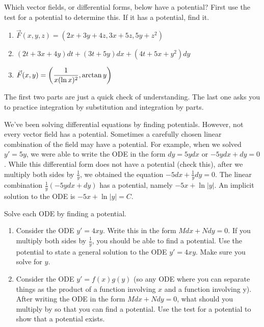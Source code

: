 \begin{problem}
Which vector fields, or differential forms, below have a potential?  First use the test for a potential to determine this.  If it has a potential, find it.
\begin{enumerate}
 \item %
$\vec F(x,y,z) = (2x+3y+4z,3x+5z,5y+z^2)$
 \item %
$(2t+3x+4y)dt+(3t+5y)dx+(4t+5x+y^2)dy$
 \item %
$\displaystyle\vec F (x,y)=\left(\frac{1}{x(\ln x)^2}, \arctan y\right)$ 
\end{enumerate}
The first two parts are just a quick check of understanding.  The last one asks you to practice integration by substitution and integration by parts. 
\end{problem}

We've been solving differential equations by finding potentials. However, not every vector field has a potential. 
Sometimes a carefully chosen linear combination of the field may have a potential. For example, when we solved $y'=5y$, we were able to write the ODE in the form $dy=5ydx$ or $-5ydx+dy=0$. While this differential form does not have a potential (check this), after we multiply both sides by $\frac{1}{y}$, we obtained the equation $-5dx+\frac{1}{y}dy=0$.   The linear combination $\frac{1}{y}(-5ydx+dy)$ has a potential, namely $-5x+\ln|y|$.  An implicit solution to the ODE is $-5x+\ln|y|=C$.  

\begin{problem}
 Solve each ODE by finding a potential.
\begin{enumerate}
 \item 
{}%
Consider the ODE $y'=4xy$. Write this in the form $Mdx+Ndy=0$. If you multiply both sides by $\frac{1}{y}$, you should be able to find a potential. Use the potential to state a general solution to the ODE $y'=4xy$. Make sure you solve for $y$.  
 \item
{}%
 Consider the ODE $y'=f(x)g(y)$ (so any ODE where you can separate things as the product of a function involving $x$ and a function involving y).  After writing the ODE in the form $Mdx+Ndy=0$, what should you multiply by so that you can find a potential. Use the test for a potential to show that a potential exists.
\end{enumerate}
\end{problem}





